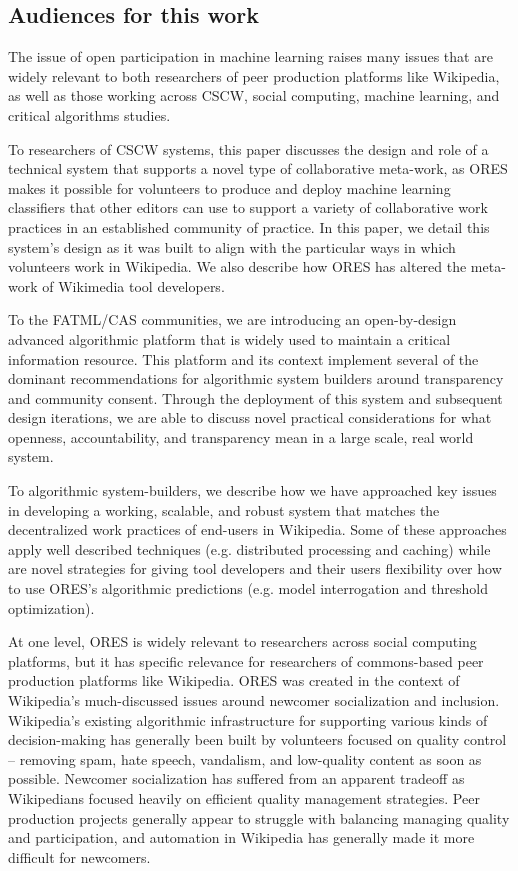 \subsection{Audiences for this work}
The issue of open participation in machine learning raises many issues that are widely relevant to both researchers of peer production platforms like Wikipedia, as well as those working across CSCW, social computing, machine learning, and critical algorithms studies.

To researchers of CSCW systems, this paper discusses the design and role of a technical system that supports a novel type of collaborative meta-work, as ORES makes it possible for volunteers to produce and deploy machine learning classifiers that other editors can use to support a variety of collaborative work practices in an established community of practice. In this paper, we detail this system's design as it was built to align with the particular ways in which volunteers work in Wikipedia. We also describe how ORES has altered the meta-work of Wikimedia tool developers.

To the FATML/CAS communities, we are introducing an open-by-design advanced algorithmic platform that is widely used to maintain a critical information resource.  This platform and its context implement several of the dominant recommendations for algorithmic system builders around transparency and community consent.  Through the deployment of this system and subsequent design iterations, we are able to discuss novel practical considerations for what openness, accountability, and transparency mean in a large scale, real world system.

To algorithmic system-builders, we describe how we have approached key issues in developing a working, scalable, and robust system that matches the decentralized work practices of end-users in Wikipedia.  Some of these approaches apply well described techniques (e.g. distributed processing and caching) while are novel strategies for giving tool developers and their users flexibility over how to use ORES's algorithmic predictions (e.g. model interrogation and threshold optimization).

At one level, ORES is widely relevant to researchers across social computing platforms, but it has specific relevance for researchers of commons-based peer production platforms like Wikipedia. ORES was created in the context of Wikipedia's much-discussed issues around newcomer socialization and inclusion. Wikipedia's existing algorithmic infrastructure for supporting various kinds of decision-making has generally been built by volunteers focused on quality control -- removing spam, hate speech, vandalism, and low-quality content as soon as possible. Newcomer socialization has suffered from an apparent tradeoff as Wikipedians focused heavily on efficient quality management strategies\cite{halfaker2013rise, halfaker2014snuggle}. Peer production projects generally appear to struggle with balancing managing quality and participation\cite{teblunthuis2018revisiting}, and automation in Wikipedia has generally made it more difficult for newcomers.

